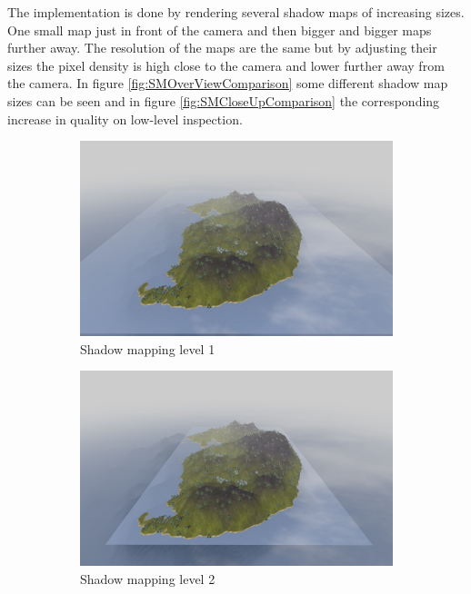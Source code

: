 The implementation is done by rendering several shadow maps of increasing sizes. One small map just in front of the camera and then bigger and bigger maps further away. The resolution of the maps are the same but by adjusting their sizes the pixel density is high close to the camera and lower further away from the camera. In figure \ref{fig:SMOverViewComparison} some different shadow map sizes can be seen and in figure \ref{fig:SMCloseUpComparison} the corresponding increase in quality on low-level inspection. 
\newpage
\begin{figure}[H]
\begin{subfigure}{\textwidth/3}
  \centering
  \includegraphics[width=0.9\linewidth]{images/SMOverViewLvl1.jpg}
  \caption{Shadow mapping level 1}
  \label{fig:SMOverViewLvl1}
\end{subfigure}%
\begin{subfigure}{\textwidth/3}
  \centering
  \includegraphics[width=0.9\linewidth]{images/SMOverViewLvl2.jpg}
  \caption{Shadow mapping level 2}
  \label{fig:SMOverViewLvl2}
\end{subfigure}
\begin{subfigure}{\textwidth/3}

\end{subfigure}
\end{figure}

